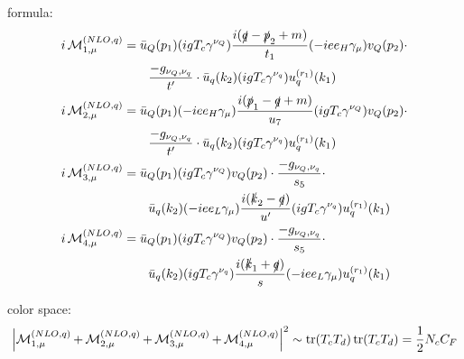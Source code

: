 formula:
\begin{align}
i\operatorname{\mathcal M}^{(NLO,q)}_{1,\mu} &= \bar u_Q(p_1)(igT_c\gamma^{\nu_Q})\frac{i(\slashed{q}-\slashed{p}_2+m)}{t_1}(-i e e_H \gamma_\mu)v_Q(p_2)\cdot \nonumber\\
 &\hspace{20pt}\frac{-g_{\nu_Q,\nu_q}}{t'} \cdot \bar u_q(k_2)(igT_c\gamma^{\nu_q})u^{(r_1)}_q(k_1)\\
i\operatorname{\mathcal M}^{(NLO,q)}_{2,\mu} &= \bar u_Q(p_1)(-i e e_H \gamma_\mu)\frac{i(\slashed{p}_1-\slashed{q}+m)}{u_7}(igT_c\gamma^{\nu_Q})v_Q(p_2) \cdot \nonumber\\
&\hspace{20pt} \frac{-g_{\nu_Q,\nu_q}}{t'} \cdot \bar u_q(k_2)(igT_c\gamma^{\nu_q})u^{(r_1)}_q(k_1)\\
i\operatorname{\mathcal M}^{(NLO,q)}_{3,\mu} &= \bar u_Q(p_1)(igT_c\gamma^{\nu_Q})v_Q(p_2) \cdot \frac{-g_{\nu_Q,\nu_q}}{s_5} \cdot \nonumber\\
 &\hspace{20pt}\bar u_q(k_2)(-i e e_L \gamma_\mu)\frac{i(\slashed{k}_2-\slashed{q})}{u'}(igT_c\gamma^{\nu_q})u^{(r_1)}_q(k_1)\\
i\operatorname{\mathcal M}^{(NLO,q)}_{4,\mu} &= \bar u_Q(p_1)(igT_c\gamma^{\nu_Q})v_Q(p_2) \cdot \frac{-g_{\nu_Q,\nu_q}}{s_5} \cdot \nonumber\\
 &\hspace{20pt}\bar u_q(k_2)(igT_c\gamma^{\nu_q})\frac{i(\slashed{k}_1+\slashed{q})}{s}(-i e e_L \gamma_\mu)u^{(r_1)}_q(k_1)
\end{align}

color space:
\begin{equation}
\left|\operatorname{\mathcal M}^{(NLO,q)}_{1,\mu}+\operatorname{\mathcal M}^{(NLO,q)}_{2,\mu}+\operatorname{\mathcal M}^{(NLO,q)}_{3,\mu}+\operatorname{\mathcal M}^{(NLO,q)}_{4,\mu}\right|^2 \sim \operatorname{\text{tr}}(T_c T_d)\operatorname{\text{tr}}(T_c T_d) = \frac 1 2 N_c C_F
\end{equation}
